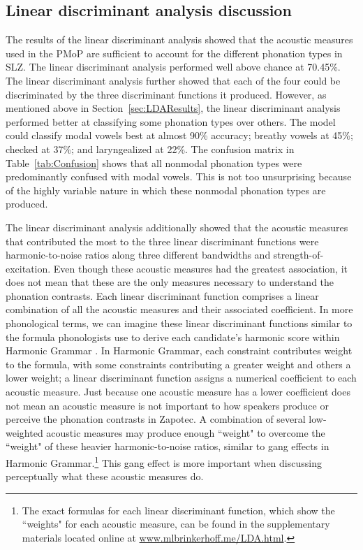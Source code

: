 \documentclass[12pt, letterpaper]{article}
\begin{document}
\subsection{Linear discriminant analysis discussion} \label{sec:DiscussionLDA}
The results of the linear discriminant analysis showed that the acoustic measures used in the PMoP are sufficient to account for the different phonation types in SLZ. The linear discriminant analysis performed well above chance at 70.45\%. The linear discriminant analysis further showed that each of the four could be discriminated by the three discriminant functions it produced. However, as mentioned above in Section~\ref{sec:LDAResults}, the linear discriminant analysis performed better at classifying some phonation types over others. The model could classify modal vowels best at almost 90\% accuracy; breathy vowels at 45\%; checked at 37\%; and laryngealized at 22\%. The confusion matrix in Table~\ref{tab:Confusion} shows that all nonmodal phonation types were predominantly confused with modal vowels. This is not too unsurprising because of the highly variable nature in which these nonmodal phonation types are produced. 

The linear discriminant analysis additionally showed that the acoustic measures that contributed the most to the three linear discriminant functions were harmonic-to-noise ratios along three different bandwidths and strength-of-excitation. Even though these acoustic measures had the greatest association, it does not mean that these are the only measures necessary to understand the phonation contrasts. Each linear discriminant function comprises a linear combination of all the acoustic measures and their associated coefficient. In more phonological terms, we can imagine these linear discriminant functions similar to the formula phonologists use to derive each candidate's harmonic score within Harmonic Grammar \citep{smolenskyHarmonicMindNeural2006}. In Harmonic Grammar, each constraint contributes weight to the formula, with some constraints contributing a greater weight and others a lower weight; a linear discriminant function assigns a numerical coefficient to each acoustic measure. Just because one acoustic measure has a lower coefficient does not mean an acoustic measure is not important to how speakers produce or perceive the phonation contrasts in Zapotec. A combination of several low-weighted acoustic measures may produce enough ``weight" to overcome the ``weight" of these heavier harmonic-to-noise ratios, similar to gang effects in Harmonic Grammar.\footnote{The exact formulas for each linear discriminant function, which  show the ``weights" for each acoustic measure, can be found in the supplementary materials located online at \url{www.mlbrinkerhoff.me/LDA.html}.} This gang effect is more important when discussing perceptually what these acoustic measures do.  
\end{document}
